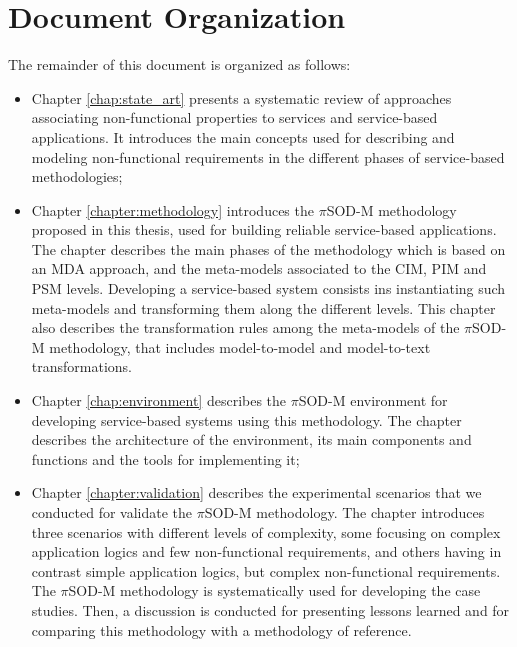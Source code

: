 \section{Document Organization}

The remainder of this document is organized as follows:

\begin{itemize}
  \item Chapter \ref{chap:state_art} presents a systematic review of approaches
  associating non-functional properties to services and service-based
  applications. It introduces the main concepts used for describing and modeling
  non-functional requirements in the different phases of service-based
  methodologies;
  
  
  \item Chapter \ref{chapter:methodology} introduces the $\pi$SOD-M
  methodology proposed in this thesis, used for building reliable
  service-based applications. The chapter describes the main phases of the
  methodology which is based on an MDA approach, and the meta-models associated
  to the CIM, PIM and PSM levels. Developing a service-based system consists ins instantiating such meta-models and
  transforming them along the different levels. This chapter also describes the
  transformation rules among the meta-models of the $\pi$SOD-M methodology, that
  includes model-to-model and model-to-text transformations.
  
  \item  Chapter \ref{chap:environment} describes the $\pi$SOD-M
  environment for developing service-based systems using this methodology. The
  chapter describes the architecture of the environment, its main
  components and functions and the tools for implementing it;
  
  \item Chapter \ref{chapter:validation} describes the experimental scenarios
  that we conducted for validate the $\pi$SOD-M methodology. The chapter
  introduces three scenarios with different levels of complexity, some focusing
  on complex application logics and few non-functional requirements, and others
  having in contrast simple application logics, but complex non-functional
  requirements. The $\pi$SOD-M methodology is systematically used for developing
  the case studies. Then, a discussion is conducted for presenting lessons
  learned and for comparing this methodology with a methodology of reference.


\end{itemize}
